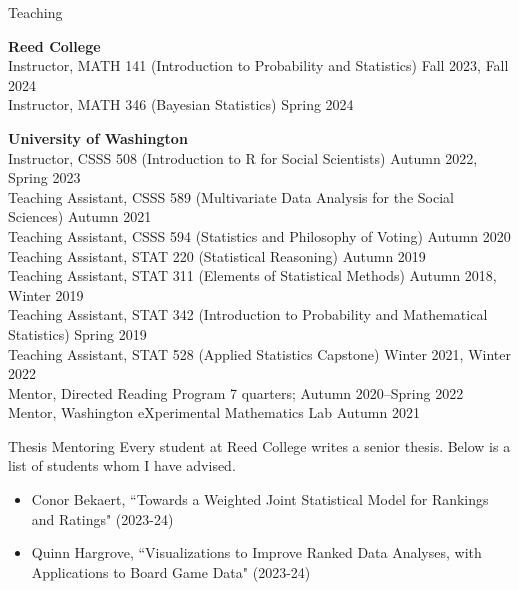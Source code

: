 \documentclass{resume} %
\begin{document}
\newpage
\begin{rSection}{Teaching}

\textbf{Reed College}
\\ Instructor, MATH 141 (Introduction to Probability and Statistics) \hfill {Fall 2023, Fall 2024}
\\ Instructor, MATH 346 (Bayesian Statistics) \hfill {Spring 2024}

\textbf{University of Washington}
\\ Instructor, CSSS 508 (Introduction to R for Social Scientists) \hfill {Autumn 2022, Spring 2023}
\\ Teaching Assistant, CSSS 589 (Multivariate Data Analysis for the Social Sciences) \hfill Autumn 2021
\\ Teaching Assistant, CSSS 594 (Statistics and Philosophy of Voting) \hfill Autumn 2020
\\ Teaching Assistant, STAT 220 (Statistical Reasoning) \hfill {Autumn 2019}
\\ Teaching Assistant, STAT 311 (Elements of Statistical Methods) \hfill {Autumn 2018, Winter 2019}
\\ Teaching Assistant, STAT 342 (Introduction to Probability and Mathematical Statistics) \hfill {Spring 2019}
\\ Teaching Assistant, STAT 528 (Applied Statistics Capstone) \hfill {Winter 2021, Winter 2022}
\\ Mentor, Directed Reading Program \hfill{7 quarters; Autumn 2020--Spring 2022}
\\ Mentor, Washington eXperimental Mathematics Lab \hfill {Autumn 2021}

\end{rSection}

\begin{rSection}{Thesis Mentoring}
Every student at Reed College writes a senior thesis. Below is a list of students whom I have advised.
\begin{itemize}
\item Conor Bekaert, ``Towards a Weighted Joint Statistical Model for Rankings and Ratings" (2023-24)
\item Quinn Hargrove, ``Visualizations to Improve Ranked Data Analyses, with Applications to Board Game Data" (2023-24)
\end{itemize}

\end{rSection}
\end{document}
